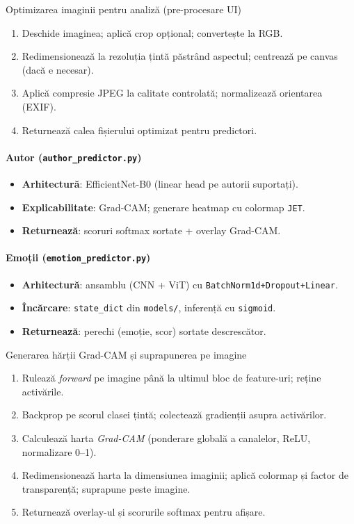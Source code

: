 \begin{algorithm}[H]
\caption{Optimizarea imaginii pentru analiză (pre-procesare UI)}
\label{alg:c5-optimize-image}
\begin{enumerate}
  \item Deschide imaginea; aplică crop opțional; convertește la RGB.
  \item Redimensionează la rezoluția țintă păstrând aspectul; centrează pe canvas (dacă e necesar).
  \item Aplică compresie JPEG la calitate controlată; normalizează orientarea (EXIF).
  \item Returnează calea fișierului optimizat pentru predictori.
\end{enumerate}
\end{algorithm}

\paragraph{Autor (\texttt{author\_predictor.py})}
\begin{itemize}
  \item \textbf{Arhitectură}: EfficientNet-B0 (linear head pe autorii suportați).
  \item \textbf{Explicabilitate}: Grad-CAM; generare heatmap cu colormap \texttt{JET}.
  \item \textbf{Returnează}: scoruri softmax sortate + overlay Grad-CAM.
\end{itemize}

\paragraph{Emoții (\texttt{emotion\_predictor.py})}
\begin{itemize}
  \item \textbf{Arhitectură}: ansamblu (CNN + ViT) cu \texttt{BatchNorm1d+Dropout+Linear}.
  \item \textbf{Încărcare}: \texttt{state\_dict} din \texttt{models/}, inferență cu \texttt{sigmoid}.
  \item \textbf{Returnează}: perechi (emoție, scor) sortate descrescător.
\end{itemize}

\begin{algorithm}[H]
\caption{Generarea hărții Grad-CAM și suprapunerea pe imagine}
\label{alg:c5-gradcam}
\begin{enumerate}
  \item Rulează \emph{forward} pe imagine până la ultimul bloc de feature-uri; reține activările.
  \item Backprop pe scorul clasei țintă; colectează gradienții asupra activărilor.
  \item Calculează harta \emph{Grad-CAM} (ponderare globală a canalelor, ReLU, normalizare 0–1).
  \item Redimensionează harta la dimensiunea imaginii; aplică colormap și factor de transparență; suprapune peste imagine.
  \item Returnează overlay-ul și scorurile softmax pentru afișare.
\end{enumerate}
\end{algorithm}

